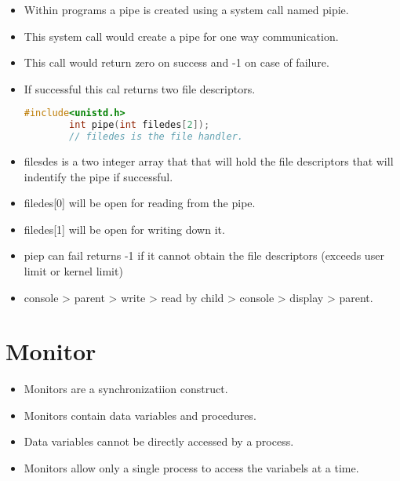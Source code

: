 \documentclass[11pt]{article}
\begin{document}
\begin{itemize}
	\item Within programs a pipe is created using a system call named pipie.
	\item This system call would create a pipe for one way communication. 
	\item This call would return zero on success and -1 on case of failure. 
	\item If successful this cal returns two file descriptors. 
	\begin{lstlisting}[language = C]
		#include<unistd.h>
		int pipe(int filedes[2]);
		// filedes is the file handler. 
	\end{lstlisting}
	\item filesdes is a two integer array that that will hold the file descriptors that will indentify the pipe if successful. 
	\item filedes[0] will be open for reading from the pipe. 
	\item filedes[1] will be open for writing down it. 
	\item piep can fail returns -1 if it cannot obtain the file descriptors (exceeds user limit or kernel limit)
	\item console > parent > write > read by child > console > display > parent.
\end{itemize}

\section{Monitor}
\begin{itemize}
	\item Monitors are a synchronizatiion construct. 
	\item Monitors contain data variables and procedures. 
	\item Data variables cannot be directly accessed by a process. 
	\item Monitors allow only a single process to access the variabels at a time. 
\end{itemize}
\end{document}
